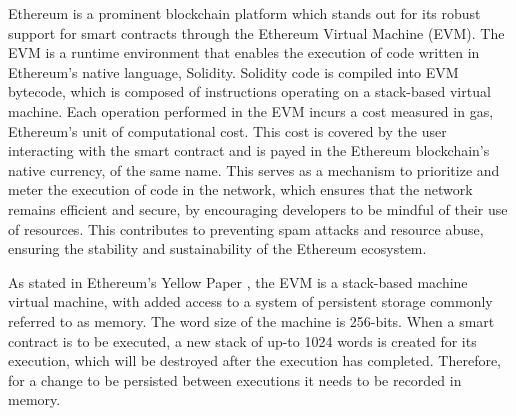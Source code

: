 Ethereum is a prominent blockchain platform which stands out for its robust
support for smart contracts through the Ethereum Virtual Machine (EVM). The
EVM is a runtime environment that enables the execution of code written in
Ethereum's native language, Solidity. Solidity code is compiled into EVM 
bytecode, which is composed of instructions operating on a stack-based 
virtual machine. Each operation performed in the EVM incurs a cost measured 
in gas, Ethereum's unit of computational cost. This cost is covered by the 
user interacting with the smart contract and is payed in the Ethereum 
blockchain's native currency, of the same name. This serves as a mechanism 
to prioritize and meter the execution of code in the network, which ensures 
that the network remains efficient and secure, by encouraging developers to 
be mindful of their use of resources. This contributes to preventing spam 
attacks and resource abuse, ensuring the stability and sustainability of the 
Ethereum ecosystem.

As stated in Ethereum's Yellow Paper \cite{wood2014ethereum}, the EVM is a 
stack-based machine virtual machine, with added access to a system of persistent 
storage commonly referred to as memory. The word size of the machine is 256-bits.
When a smart contract is to be executed, a new stack of up-to 1024 words is 
created for its execution, which will be destroyed after the execution has 
completed. Therefore, for a change to be persisted between executions it needs
to be recorded in memory.

